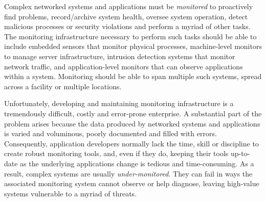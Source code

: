 

Complex networked systems and applications must be {\em monitored} to
proactively find problems, record/archive system health, oversee
system operation, detect malicious processes or security violations
and perform a myriad of other tasks.  
The monitoring infrastructure necessary to perform such tasks should
be able to include embedded sensors that monitor physical processes,
machine-level monitors to manage server infrastructure, intrusion
detection systems that monitor network traffic, and application-level
monitors that can observe applications within a system. Monitoring
should be able to span multiple such systems, spread across a facility
or multiple locations.

Unfortunately, developing and maintaining monitoring
infrastructure is a tremendously difficult, costly and error-prone
enterprise. A substantial part of the problem arises because
the data produced by networked systems and applications is
varied and voluminous, poorly documented and filled
with errors.  Consequently, application developers normally lack the time,
skill or discipline to create robust monitoring tools, and, even if they do,
keeping their tools up-to-date as the underlying applications change
is tedious and time-consuming.  As a
result, complex systems are usually {\em under-monitored}. They can
fail in ways the associated monitoring system cannot observe or help
diagnose, leaving high-value systems vulnerable to a myriad of threats.

